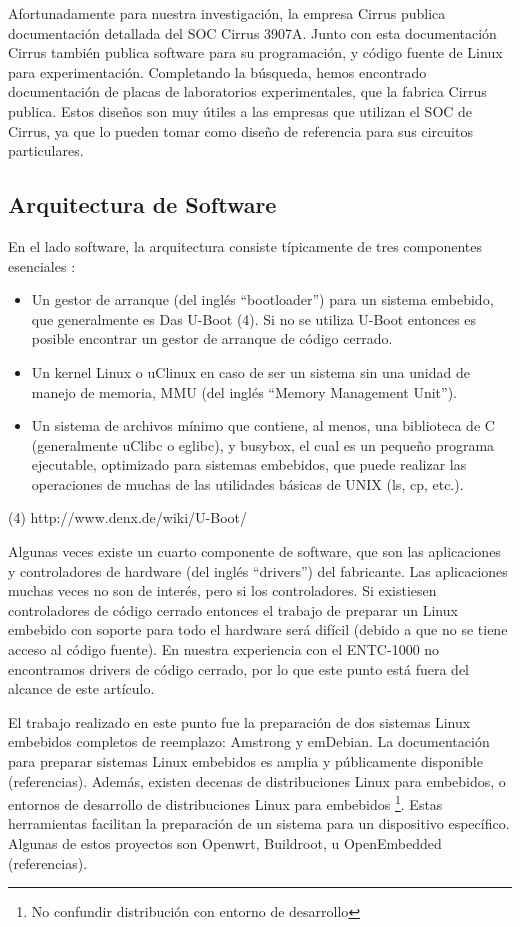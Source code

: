 \documentclass[conference]{IEEEtran}
\begin{document}
Afortunadamente para nuestra investigación,
la empresa Cirrus publica documentación detallada del SOC Cirrus 3907A.
Junto con esta documentación Cirrus también publica software
para su programación, y código fuente de
Linux para experimentación. Completando la búsqueda, hemos encontrado
documentación de placas de laboratorios experimentales, que la fabrica Cirrus publica.
Estos diseños son muy útiles a las empresas que utilizan el SOC de Cirrus,
ya que lo pueden tomar como diseño de referencia para sus circuitos particulares.


\subsection{Arquitectura de Software}


En el lado software, la arquitectura consiste típicamente de tres componentes esenciales :

\begin{itemize}
\item Un gestor de arranque (del inglés ``bootloader'') para un sistema embebido,
que generalmente es Das U-Boot (4). Si no se utiliza U-Boot entonces
es posible encontrar un gestor de arranque de código cerrado.
\item Un kernel Linux o uClinux en caso de ser un sistema sin una
unidad de manejo de memoria, MMU (del inglés ``Memory Management Unit''). 
\item Un sistema de archivos mínimo que contiene, al menos, una biblioteca de C
(generalmente uClibc o eglibc), y busybox, el cual es un pequeño programa ejecutable,
optimizado para sistemas embebidos, que puede realizar las operaciones
de muchas de las utilidades  básicas de UNIX (ls, cp, etc.).
\end{itemize}

(4) http://www.denx.de/wiki/U-Boot/

Algunas veces existe un cuarto componente de software, que son las aplicaciones
y controladores de hardware (del inglés ``drivers'') del fabricante.
Las aplicaciones muchas veces no son de interés, pero si los controladores.
Si existiesen controladores de código cerrado
entonces el trabajo de preparar un Linux embebido con soporte
para todo el hardware será difícil (debido a que no se tiene acceso
al código fuente). En nuestra experiencia con el ENTC-1000 no encontramos drivers
de código cerrado, por lo que este punto está fuera del alcance de este artículo. 

El trabajo realizado en este punto fue la preparación
de dos sistemas Linux embebidos completos de reemplazo: Amstrong y emDebian.
La documentación para preparar sistemas Linux embebidos es amplia y públicamente
disponible (referencias). Además, existen decenas de
distribuciones Linux para embebidos,
o entornos de desarrollo de distribuciones Linux para embebidos 
\footnote{No confundir distribución con entorno de desarrollo}. Estas herramientas
facilitan la preparación de un sistema para un dispositivo específico.
Algunas de estos proyectos son Openwrt, Buildroot, u OpenEmbedded (referencias).
\end{document}

